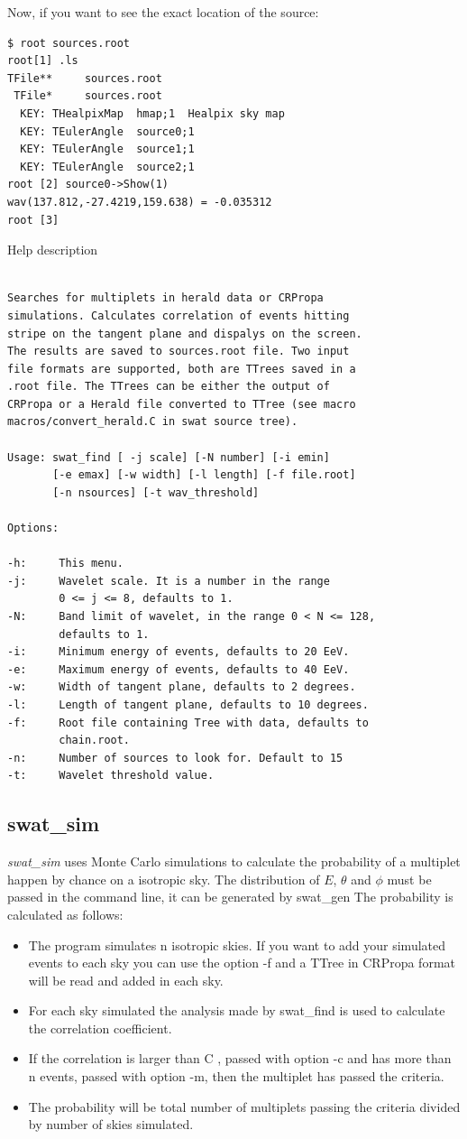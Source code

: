 \documentclass[12pt]{article}
\begin{document}
Now, if you want to see the exact location of the source:
{\bf \color{textcolor}
\begin{lstlisting}
$ root sources.root
root[1] .ls
TFile**		sources.root	
 TFile*		sources.root	
  KEY: THealpixMap	hmap;1	Healpix sky map
  KEY: TEulerAngle	source0;1	
  KEY: TEulerAngle	source1;1	
  KEY: TEulerAngle	source2;1	
root [2] source0->Show(1)
wav(137.812,-27.4219,159.638) = -0.035312
root [3] 
\end{lstlisting}
}

Help description
{\bf \color{textcolor}
\begin{lstlisting}

Searches for multiplets in herald data or CRPropa
simulations. Calculates correlation of events hitting
stripe on the tangent plane and dispalys on the screen.
The results are saved to sources.root file. Two input
file formats are supported, both are TTrees saved in a
.root file. The TTrees can be either the output of
CRPropa or a Herald file converted to TTree (see macro
macros/convert_herald.C in swat source tree).

Usage: swat_find [ -j scale] [-N number] [-i emin] 
       [-e emax] [-w width] [-l length] [-f file.root] 
       [-n nsources] [-t wav_threshold]

Options:

-h:     This menu.
-j:     Wavelet scale. It is a number in the range 
        0 <= j <= 8, defaults to 1.
-N:     Band limit of wavelet, in the range 0 < N <= 128,
        defaults to 1.
-i:     Minimum energy of events, defaults to 20 EeV.
-e:     Maximum energy of events, defaults to 40 EeV.
-w:     Width of tangent plane, defaults to 2 degrees.
-l:     Length of tangent plane, defaults to 10 degrees.
-f:     Root file containing Tree with data, defaults to
        chain.root.
-n:     Number of sources to look for. Default to 15
-t:     Wavelet threshold value.
\end{lstlisting}
}
\subsection{swat\_sim}
{\it swat\_sim} uses Monte Carlo simulations to calculate the probability of a
multiplet happen by chance on a isotropic sky. The distribution of $E$, $\theta$
and $\phi$ must be passed in the command line, it can be generated by swat\_gen The
probability is calculated as follows: 
\begin{itemize}
\item The program simulates n isotropic skies. If you want to add your simulated events
to each sky you can use the option -f and a TTree in CRPropa format will be read
and added in each sky.
\item For each sky simulated the analysis made by swat\_find is used to calculate the
correlation coefficient. 
\item If the correlation is larger than C , passed with option -c and has more than n events, passed 
with option -m, then the multiplet has passed the criteria.
\item The probability will be total number of multiplets passing the criteria divided by 
number of skies simulated.
\end{itemize}
\end{document}

